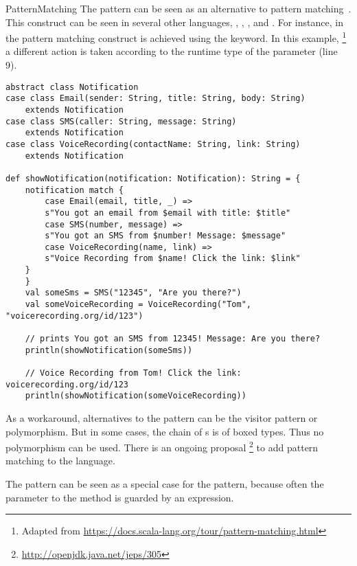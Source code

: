 \begin{pattern}{PatternMatching}
The \thisp{} pattern can be seen as an \adhoc{} alternative to pattern matching~\citep{lavilleLazyPatternMatching1987}.
This construct can be seen in several other languages, \eg, \scala{}, \csharp{}, and \haskell{}.
For instance, in \scala{} the pattern matching construct is achieved using the  keyword.
In this example,%
\footnote{Adapted from \url{https://docs.scala-lang.org/tour/pattern-matching.html}}
a different action is taken according to the runtime type of the parameter  (line 9).

\begin{verbatim}
abstract class Notification
case class Email(sender: String, title: String, body: String)
	extends Notification
case class SMS(caller: String, message: String)
	extends Notification
case class VoiceRecording(contactName: String, link: String)
	extends Notification

def showNotification(notification: Notification): String = {
	notification match {
		case Email(email, title, _) =>
		s"You got an email from $email with title: $title"
		case SMS(number, message) =>
		s"You got an SMS from $number! Message: $message"
		case VoiceRecording(name, link) =>
		s"Voice Recording from $name! Click the link: $link"
	}
	}
	val someSms = SMS("12345", "Are you there?")
	val someVoiceRecording = VoiceRecording("Tom", "voicerecording.org/id/123")
	
	// prints You got an SMS from 12345! Message: Are you there?
	println(showNotification(someSms))
	
	// Voice Recording from Tom! Click the link: voicerecording.org/id/123	
	println(showNotification(someVoiceRecording))
\end{verbatim}

As a workaround, alternatives to the \thisp{} pattern can be the visitor pattern or polymorphism.
But in some cases, the chain of s is of boxed types.
Thus no polymorphism can be used.
There is an ongoing proposal%
\footnote{\url{http://openjdk.java.net/jeps/305}}
to add pattern matching to the \java{} language.

\related{}
The  pattern can be seen as a special case for the \thisp{} pattern, because often the parameter to the  method is guarded by an  expression.
\end{pattern}